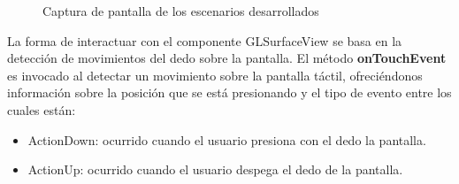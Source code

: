 \begin{figure}[h]
	\centering	
	\hspace*{0.5cm}
	\caption{Captura de pantalla de los escenarios desarrollados}
\end{figure}

La forma de interactuar con el componente GLSurfaceView se basa en la detección de movimientos del dedo sobre la pantalla. El método \textbf{onTouchEvent} es invocado al detectar un movimiento sobre la pantalla táctil, ofreciéndonos información sobre la posición que se está presionando y el tipo de evento entre los cuales están:
\begin{itemize}
\item ActionDown: ocurrido cuando el usuario presiona con el dedo la pantalla.
\item ActionUp: ocurrido cuando el usuario despega el dedo de la pantalla.
\end{itemize}

